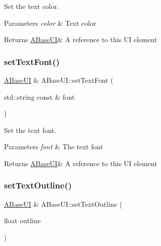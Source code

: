 Set the text color. 


\begin{DoxyParams}{Parameters}
{\em color} & Text color \\
\hline
\end{DoxyParams}
\begin{DoxyReturn}{Returns}
\hyperlink{class_a_base_u_i}{A\+Base\+UI}\& A reference to this UI element 
\end{DoxyReturn}
\mbox{\label{class_a_base_u_i_a705188de51bf8387d38dca90740262a0}} 
\subsubsection{\texorpdfstring{set\+Text\+Font()}{setTextFont()}}
{\footnotesize\ttfamily \hyperlink{class_a_base_u_i}{A\+Base\+UI} \& A\+Base\+U\+I\+::set\+Text\+Font (\begin{DoxyParamCaption}\item[{std\+::string const \&}]{font }\end{DoxyParamCaption})\hspace{0.3cm}{\ttfamily [virtual]}}



Set the text font. 


\begin{DoxyParams}{Parameters}
{\em font} & The text font \\
\hline
\end{DoxyParams}
\begin{DoxyReturn}{Returns}
\hyperlink{class_a_base_u_i}{A\+Base\+UI}\& A reference to this UI element 
\end{DoxyReturn}
\mbox{\label{class_a_base_u_i_a1bafea512714350e238ef0cf0bd4e416}} 
\subsubsection{\texorpdfstring{set\+Text\+Outline()}{setTextOutline()}}
{\footnotesize\ttfamily \hyperlink{class_a_base_u_i}{A\+Base\+UI} \& A\+Base\+U\+I\+::set\+Text\+Outline (\begin{DoxyParamCaption}\item[{float}]{outline }\end{DoxyParamCaption})\hspace{0.3cm}{\ttfamily [virtual]}}



